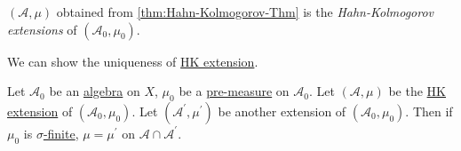 \begin{definition}[HK extension]\label{def:HK-extension}
	\((\mathcal{A} , \mu )\) obtained from \autoref{thm:Hahn-Kolmogorov-Thm} is the \emph{Hahn-Kolmogorov extensions} of \((\mathcal{A} _0, \mu _0)\).
\end{definition}

We can show the uniqueness of \hyperref[def:HK-extension]{HK extension}.

\begin{theorem}\label{thm:uniqueness-of-HK-extension}
	Let \(\mathcal{A}_0\) be an \hyperref[def:algebra]{algebra} on \(X\), \(\mu _0\) be a \hyperref[def:pre-measure]{pre-measure} on \(\mathcal{A} _0\). Let \((\mathcal{A} , \mu)\)
	be the \hyperref[def:HK-extension]{HK extension} of \((\mathcal{A} _0, \mu _0)\). Let \((\mathcal{A} ^\prime , \mu ^\prime )\) be another extension of \((\mathcal{A} _0, \mu _0)\).
	Then if \(\mu _0\) is \hyperref[def:sigma-finite-measure]{\(\sigma\)-finite}, \(\mu  = \mu ^\prime \) on \(\mathcal{A} \cap \mathcal{A} ^\prime \).
\end{theorem}
